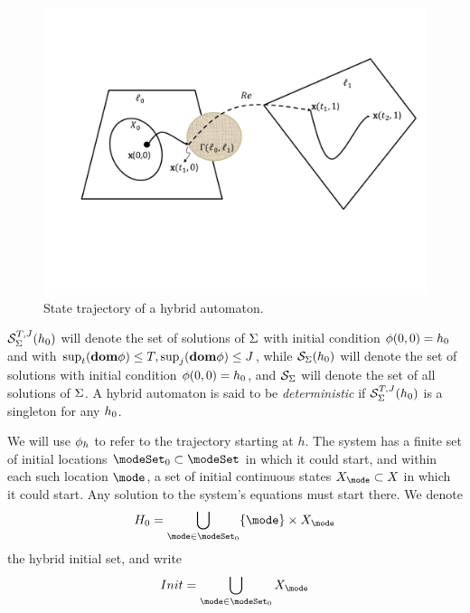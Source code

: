 \begin{figure}[tb]
	\centering
	\includegraphics[scale=0.4]{figures/HA.pdf}
	\caption{State trajectory of a hybrid automaton.}
	\label{fig:HA}
\end{figure}

\begin{defn}
	\label{def:solutionsets}
	$\mathcal{S}_\Sigma^{T,J}(h_0)$ will denote the set of solutions of $\Sigma$ with initial condition $\mathbf{\phi}(0,0) = h_0$ and with $\sup_t(\mathbf{dom} \mathbf{\phi}) \leq T, \sup_j(\mathbf{dom} \mathbf{\phi}) \leq J$,
	while $\mathcal{S}_\Sigma(h_0)$ will denote the set of solutions with initial condition $\mathbf{\phi}(0,0) = h_0$,
	and $\mathcal{S}_\Sigma$ will denote the set of all solutions of $\Sigma$.
	A hybrid automaton is said to be \emph{deterministic} if $\mathcal{S}_\Sigma^{T,J}(h_0)$ is a singleton for any $h_0$.
\end{defn}

We will use $\mathbf{\phi}_h$ to refer to the trajectory starting at $h$.
The system has a finite set of initial locations $\modeSet_0 \subset \modeSet$ in which it could start, 
and within each such location $\mode$, a set of initial continuous states $\stSet_\mode \subset \stSet$ in which it could start. 
Any solution to the system's equations must start there. We denote 
\[H_0 = \bigcup_{\mode \in \modeSet_0} \{\mode\}\times \stSet_\mode\]
the hybrid initial set, and write
\[Init = \bigcup_{\mode \in \modeSet_0}\stSet_\mode \]
